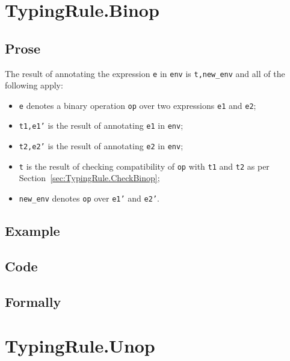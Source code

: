 \documentclass{book}
\begin{document}
\section{TypingRule.Binop \label{sec:TypingRule.Binop}}

  \subsection{Prose}
  The result of annotating the expression \texttt{e} in \texttt{env} is
\texttt{t,new\_env} and all of the following apply:
  \begin{itemize}
  \item \texttt{e} denotes a binary operation \texttt{op} over two expressions \texttt{e1} and \texttt{e2};
  \item \texttt{t1,e1'} is the result of annotating \texttt{e1} in \texttt{env};
  \item \texttt{t2,e2'} is the result of annotating \texttt{e2} in \texttt{env};
  \item \texttt{t} is the result of checking compatibility of \texttt{op} with \texttt{t1} and \texttt{t2} as per Section~\ref{sec:TypingRule.CheckBinop};
  \item \texttt{new\_env} denotes \texttt{op} over \texttt{e1'} and \texttt{e2'}.
  \end{itemize}

  \subsection{Example}

  \subsection{Code}

\begin{emptyformal}
    \subsection{Formally}
\end{emptyformal}


\section{TypingRule.Unop \label{sec:TypingRule.Unop}}
\end{document}
